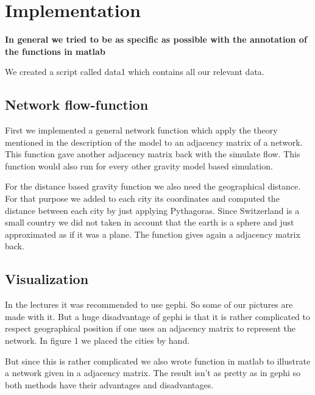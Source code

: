 \documentclass[11pt]{article}
\begin{document}
\section{Implementation}
\textbf{In general we tried to be as specific as possible with the annotation of the functions in matlab}

We created a script called data1 which contains all our relevant data.

\subsection{Network flow-function}
First we implemented a general network function which apply the theory mentioned in the description of the model to an adjacency matrix of a network. This function gave another adjacency matrix back with the simulate flow. This function would also run for every other gravity model based simulation.\newline

For the distance based gravity function we also need the geographical distance. For that purpose we added to each city its coordinates and computed the distance between each city by just applying Pythagoras. Since Switzerland is a small country we did not taken in account that the earth is a sphere and just approximated as if it was a plane. The function gives again a adjacency matrix back.


\subsection{Visualization}
In the lectures it was recommended to use gephi. So some of our pictures are made with it. But a huge disadvantage of gephi is that it is rather complicated to respect geographical position if one uses an adjacency  matrix to represent the network. In figure 1 we placed the cities by hand.

But since this is rather complicated we also wrote function in matlab to illustrate a network given in a adjacency matrix. The result isn't as pretty as in gephi so both methods have their advantages and disadvantages.
\end{document}
